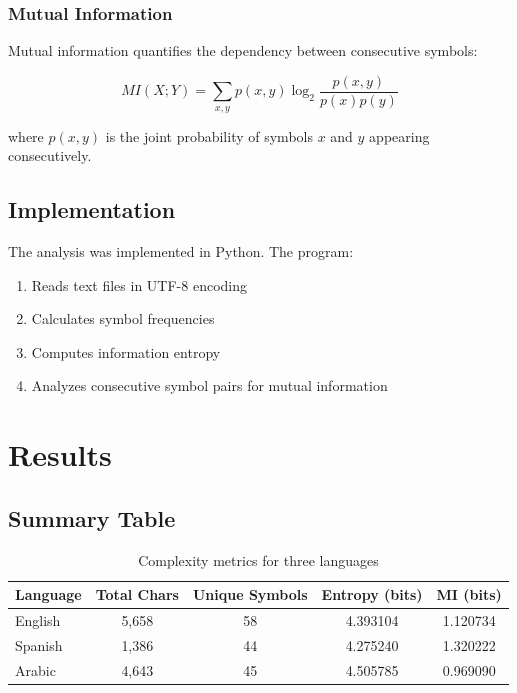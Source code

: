 \documentclass[12pt]{article}
\begin{document}
\subsubsection{Mutual Information}
Mutual information quantifies the dependency between consecutive symbols:

\begin{equation}
MI(X;Y) = \sum_{x,y} p(x,y) \log_2 \frac{p(x,y)}{p(x)p(y)}
\end{equation}

where $p(x,y)$ is the joint probability of symbols $x$ and $y$ appearing consecutively.

\subsection{Implementation}
The analysis was implemented in Python. The program:
\begin{enumerate}
    \item Reads text files in UTF-8 encoding
    \item Calculates symbol frequencies
    \item Computes information entropy
    \item Analyzes consecutive symbol pairs for mutual information
\end{enumerate}

\section{Results}

\subsection{Summary Table}

\begin{table}[h]
\centering
\begin{tabular}{lcccc}
\toprule
\textbf{Language} & \textbf{Total Chars} & \textbf{Unique Symbols} & \textbf{Entropy (bits)} & \textbf{MI (bits)} \\
\midrule
English & 5,658 & 58 & 4.393104 & 1.120734 \\
Spanish & 1,386 & 44 & 4.275240 & 1.320222 \\
Arabic  & 4,643 & 45 & 4.505785 & 0.969090 \\
\bottomrule
\end{tabular}
\caption{Complexity metrics for three languages}
\label{tab:results}
\end{table}
\end{document}
